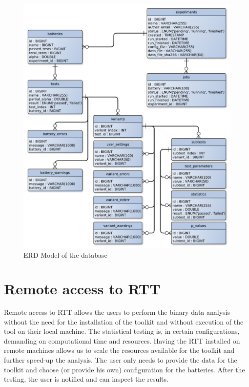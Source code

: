 \documentclass[
  digital,  	%
  color,		%
  oneside,   	%
  12pt,
  nocover,
  notable,
  nolof,
  nolot,
]{fithesis3}
\begin{document}
\label{sec:mysql_res_storage}
\begin{figure}[h!]
\begin{nomar}
\centering
\includegraphics[width=\paperwidth-3.5cm]{figures/database-erd-model.pdf}
\end{nomar}
\caption{ERD Model of the database}
\label{fig:erd_database}
\end{figure}

\section{Remote access to RTT}
Remote access to RTT allows the users to perform the binary data analysis without the need for the installation of the toolkit and without execution of the tool on their local machine. The statistical testing is, in certain configurations, demanding on computational time and resources. Having the RTT installed on remote machines allows us to scale the resources available for the toolkit and further speed-up the analysis. The user only needs to provide the data for the toolkit and choose (or provide his own) configuration for the batteries. After the testing, the user is notified and can inspect the results.
\end{document}
